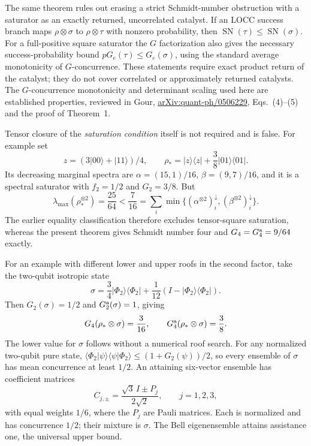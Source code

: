 The same theorem rules out erasing a strict Schmidt-number obstruction
with a saturator as an exactly returned, uncorrelated catalyst. If an LOCC
success branch maps $\rho\otimes\sigma$ to $\rho\otimes\tau$ with nonzero
probability, then
$\operatorname{SN}(\tau)\le\operatorname{SN}(\sigma)$.
For a full-positive square saturator the $G$ factorization also gives the
necessary success-probability bound
$pG_e(\tau)\le G_e(\sigma)$, using the standard average monotonicity of
$G$-concurrence. These statements require exact product return of the
catalyst; they do not cover correlated or approximately returned catalysts.
The $G$-concurrence monotonicity and determinant scaling used here are
established properties, reviewed in Gour,
\href{https://arxiv.org/abs/quant-ph/0506229}{arXiv:quant-ph/0506229},
Eqs.~(4)--(5) and the proof of Theorem~1.

Tensor closure of the \emph{saturation condition} itself is not required
and is false. For example set
\[
 z=(3|00\rangle+|11\rangle)/4,
 \qquad \rho_*=|z\rangle\langle z|+\frac38|01\rangle\langle01|.
\]
Its decreasing marginal spectra are
$\alpha=(15,1)/16$, $\beta=(9,7)/16$, and it is a spectral saturator with
$f_2=1/2$ and $G_2=3/8$. But
\[
 \lambda_{\max}(\rho_*^{\otimes2})=\frac{25}{64}
    <\frac7{16}
    =\sum_i\min\{(\alpha^{\otimes2})_i^\downarrow,
                         (\beta^{\otimes2})_i^\downarrow\}.
\]
The earlier equality classification therefore excludes tensor-square
saturation, whereas the present theorem gives Schmidt number four and
$G_4=G_4^{\rm a}=9/64$ exactly.

For an example with different lower and upper roofs in the second factor,
take the two-qubit isotropic state
\[
 \sigma=\frac34|\Phi_2\rangle\langle\Phi_2|
            +\frac1{12}(I-|\Phi_2\rangle\langle\Phi_2|).
\]
Then $G_2(\sigma)=1/2$ and $G_2^{\rm a}(\sigma)=1$, giving
\[
       G_4(\rho_*\otimes\sigma)=\frac3{16},\qquad
       G_4^{\rm a}(\rho_*\otimes\sigma)=\frac38.
\]
The lower value for $\sigma$ follows without a numerical roof search.
For any normalized two-qubit pure state,
$\langle\Phi_2|\psi\rangle\langle\psi|\Phi_2\rangle\le(1+G_2(\psi))/2$,
so every ensemble of $\sigma$ has mean concurrence at least $1/2$.
An attaining six-vector ensemble has coefficient matrices
\[
 C_{j,\pm}=\frac{\sqrt3\,I\pm P_j}{2\sqrt2},
       \qquad j=1,2,3,
\]
with equal weights $1/6$, where the $P_j$ are Pauli matrices.
Each is normalized and has concurrence $1/2$; their mixture is $\sigma$.
The Bell eigenensemble attains assistance one, the universal upper bound.

